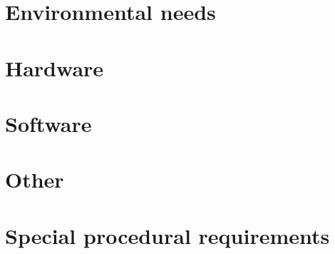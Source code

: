 \section{Environmental needs}  \label{s::environmental-needs}
	\begin{comment}
		Describe the test environment needed for test setup, execution, and results recording. This section is
		commonly documented per scenario or group of scenarios. It may be illustrated with one or more
		figures showing all of the components and where they interact. This section is only needed if it
		provides more information than the Level Test Plan or if there have been changes since the Level Test
		Plan was developed.
	\end{comment}

\section{Hardware}  \label{s::hardware}
	\begin{comment}
		Specify the characteristics and configuration(s) of the hardware required to execute this test case.
	\end{comment}
	
\section{Software}  \label{s::software}
	\begin{comment}
		Specify all software configuration(s) required to execute this test case. This may include system
		software such as operating systems, compilers, simulators, and test tools. In addition, the test item may
		interact with application software.
	\end{comment}

\section{Other}  \label{s::other}
	\begin{comment}
		Specify any other requirements not yet included [e.g., unique facility needs, specially trained
		personnel, and third-party provided environment(s)] if there are any.
	\end{comment}
	
\section{Special procedural requirements}  \label{s::special-procedural-requirements}
	\begin{comment}
		Describe any special constraints on the Level Test Procedures that execute this test case such as preand
		post-conditions and/or processing. This section may reference the use of automated test tools. This
		section provides exceptions and/or additions to the Level Test Procedures, not a repeat of any of the
		information contained in the procedures.
	\end{comment}

